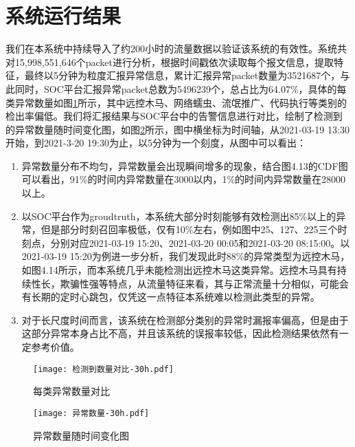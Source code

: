 \section{系统运行结果}
我们在本系统中持续导入了约200小时的流量数据以验证该系统的有效性。系统共对15,998,551,646个packet进行分析，根据时间戳依次读取每个报文信息，提取特征，最终以5分钟为粒度汇报异常信息，累计汇报异常packet数量为3521687个，与此同时，SOC平台汇报异常packet总数为5496239个，总占比为64.07\%，具体的每类异常数量如图\ref{fig:每类异常数量对比}所示，其中远控木马、网络蠕虫、流氓推广、代码执行等类别的检出率偏低。我们将汇报结果与SOC平台中的告警信息进行对比，绘制了检测到的异常数量随时间变化图，如图\ref{fig:异常数量}所示，图中横坐标为时间轴，从2021-03-19 13:30开始，到2021-3-20 19:30为止，以5分钟为一个刻度，从图中可以看出：
\begin{enumerate}
  \item 异常数量分布不均匀，异常数量会出现瞬间增多的现象，结合图4.13的CDF图可以看出，91\%的时间内异常数量在3000以内，1\%的时间内异常数量在28000以上。
  \item 以SOC平台作为groudtruth，本系统大部分时刻能够有效检测出85\%以上的异常，但是部分时刻召回率极低，仅有10\%左右，例如图中25、127、225三个时刻点，分别对应2021-03-19 15:20、2021-03-20 00:05和2021-03-20 08:15:00。以2021-03-19 15:20为例进一步分析，我们发现此时88\%的异常类型为远控木马，如图4.14所示，而本系统几乎未能检测出远控木马这类异常。远控木马具有持续性长，欺骗性强等特点，从流量特征来看，其与正常流量十分相似，可能会有长期的定时心跳包，仅凭这一点特征本系统难以检测此类型的异常。
  \item 对于长尺度时间而言，该系统在检测部分类别的异常时漏报率偏高，但是由于这部分异常本身占比不高，并且该系统的误报率较低，因此检测结果依然有一定参考价值。
\end{enumerate}

\begin{figure}
  \centering
  \texttt{[image: 检测到数量对比-30h.pdf]}
  \caption{每类异常数量对比}
  \label{fig:每类异常数量对比}
\end{figure}


\begin{figure}
  \centering
  \texttt{[image: 异常数量-30h.pdf]}
  \caption{异常数量随时间变化图}
  \label{fig:异常数量}
\end{figure}

